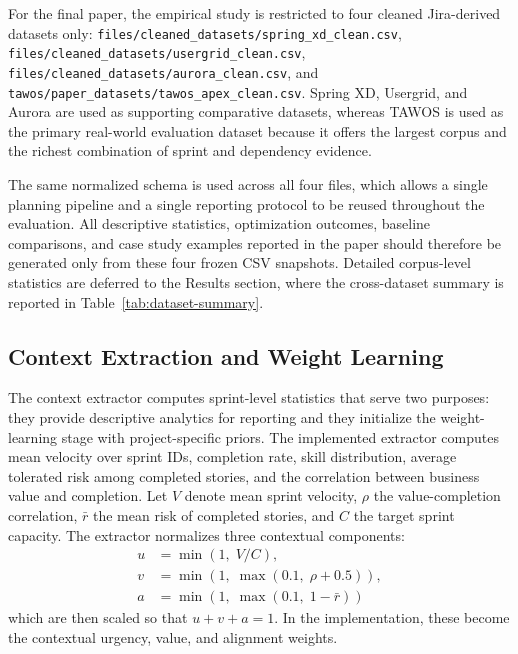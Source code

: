 \documentclass[conference]{IEEEtran}
\begin{document}
For the final paper, the empirical study is restricted to four cleaned
Jira-derived datasets only:
\texttt{files/cleaned\_datasets/spring\_xd\_clean.csv},
\texttt{files/cleaned\_datasets/usergrid\_clean.csv},
\texttt{files/cleaned\_datasets/aurora\_clean.csv}, and
\texttt{tawos/paper\_datasets/tawos\_apex\_clean.csv}.
Spring XD, Usergrid, and Aurora are used as supporting comparative datasets,
whereas TAWOS is used as the primary real-world evaluation dataset because it
offers the largest corpus and the richest combination of sprint and dependency
evidence.

The same normalized schema is used across all four files, which allows a single
planning pipeline and a single reporting protocol to be reused throughout the
evaluation.
All descriptive statistics, optimization outcomes, baseline comparisons, and case
study examples reported in the paper should therefore be generated only from these
four frozen CSV snapshots.
Detailed corpus-level statistics are deferred to the Results section, where the
cross-dataset summary is reported in Table~\ref{tab:dataset-summary}.

\subsection{Context Extraction and Weight Learning}

The context extractor computes sprint-level statistics that serve two purposes:
they provide descriptive analytics for reporting and they initialize the
weight-learning stage with project-specific priors.
The implemented extractor computes mean velocity over sprint IDs, completion rate,
skill distribution, average tolerated risk among completed stories, and the
correlation between business value and completion.
Let $V$ denote mean sprint velocity, $\rho$ the value-completion correlation, $\bar{r}$
the mean risk of completed stories, and $C$ the target sprint capacity.
The extractor normalizes three contextual components:
\begin{equation}
\begin{aligned}
u &= \min(1,\; V/C), \\
v &= \min(1,\; \max(0.1,\; \rho + 0.5)), \\
a &= \min(1,\; \max(0.1,\; 1 - \bar{r}))
\end{aligned}
\label{eq:context}
\end{equation}
which are then scaled so that $u+v+a=1$.
In the implementation, these become the contextual urgency, value, and alignment
weights.
\end{document}
